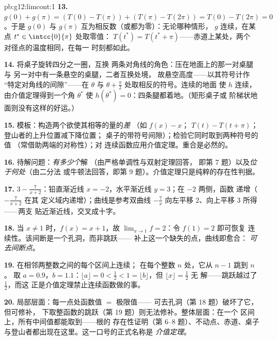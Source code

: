 \begin{solution}{pb:g12:limcont:1}
\textbf{13.} $g(0) + g(\pi) = \left(T(0) - T(\pi)\right) +
\left(T(\pi) - T(2\pi)\right) = T(0) - T(2\pi) = 0$。于是
$g(0)$ 与 $g(\pi)$ 互为相反数（或都为零）：无论哪种情形，
$g$ 连续，在某点 $t^* \in \intcc{0}{\pi}$ 处取零值：
$T(t^*) = T(t^* + \pi)$——赤道上某处，两个
对径点的温度相同，在每一
时刻都如此。

\textbf{14.} 将桌子旋转四分之一圈，互换
两条对角线的角色：压在地面上的那一对桌腿与
另一对中有一条悬空的桌腿，二者互换处境，
故悬空高度——以其符号计作
“特定对角线的间隙”——在
$\theta$ 与 $\theta + \frac\pi2$ 处取相反的符号。连续的地面
使 $h$ 连续，由介值定理得到一个角
$\theta^*$ 使 $h(\theta^*) = 0$：四条腿都着地。（矩形桌子或
阶梯状地面则没有这样的好运。）

\textbf{15.} 模板：构造两个欲使其相等的量的\emph{差}
（如 $f(x) - x$；
$T(t) - T(t + \pi)$；登山者的上升位置减下降位置；
桌子的带符号间隙）；检验它同时取到两种符号的值
（常借助两端的对称性）；对
连续函数应用介值定理。重合是必然的。

\textbf{16.} 待解问题：\emph{有多少个}解
（由严格单调性与双射定理回答，
即第 7 题）以及\emph{位于何处}（由二分法
或牛顿法回答，即第 9 题）。介值定理只是纯粹的存在性判据。

\textbf{17.} $3 - \frac{7}{x + 2}$：铅直渐近线
$x = -2$，水平渐近线 $y = 3$；在 $-2$ 两侧，函数
递增（$-\frac{7}{x+2}$ 在其
定义域内递增）；曲线是参考双曲线
$-\frac7x$ 向左平移 $2$、向上平移 $3$ 所得——两支
贴近渐近线，交叉成十字。

\textbf{18.} 当 $x \neq 1$ 时，$f(x) = x + 1$，故
$\lim_{x \to 1} f = 2$：令 $f(1) = 2$ 即可恢复
连续性。该间断是一个孔洞，而非跳跃——
补上这一个缺失的点，曲线即愈合：
\emph{可去间断点}。

\textbf{19.} 在相邻两整数之间的每个区间上连续；
在每个整数 $n$ 处，它从 $n - 1$ 跳到 $n$。
取 $a = 0.9$，$b = 1.1$：$\lfloor a \rfloor = 0 < \frac12 <
1 = \lfloor b \rfloor$，但 $\lfloor x \rfloor = \frac12$ 无
解——跳跃越过了 $\frac12$，而这
正是介值定理禁止连续函数做的事。

\textbf{20.} 局部层面：每一点处函数值 $=$ 极限值——
可去孔洞（第 18 题）破坏了它，但可修补，
下取整函数的跳跃（第 19 题）则无法修补。整体层面：在一个
区间上，所有中间值都能取到——根的
存在性证明（第 6--8 题）、不动点、赤道、桌子
与登山者都出现在这里。这一口号的正式名称是
\emph{介值定理}。
\end{solution}
